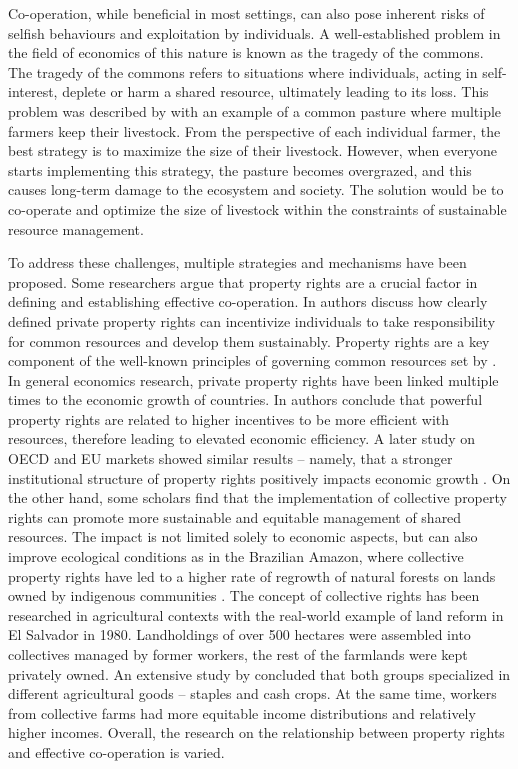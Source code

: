 \documentclass[preprint,12pt,authoryear]{elsarticle}
\begin{document}
Co-operation, while beneficial in most settings, can also pose inherent risks of selfish behaviours and exploitation by individuals. A well-established problem in the field of economics of this nature is known as the tragedy of the commons. The tragedy of the commons refers to situations where individuals, acting in self-interest, deplete or harm a shared resource, ultimately leading to its loss. This problem was described by \cite{hardin1968tragedy} with an example of a common pasture where multiple farmers keep their livestock. From the perspective of each individual farmer, the best strategy is to maximize the size of their livestock. However, when everyone starts implementing this strategy, the pasture becomes overgrazed, and this causes long-term damage to the ecosystem and society. The solution would be to co-operate and optimize the size of livestock within the constraints of sustainable resource management.

To address these challenges, multiple strategies and mechanisms have been proposed. Some researchers argue that property rights are a crucial factor in defining and establishing effective co-operation. In \cite{anderson2003property} authors discuss how clearly defined private property rights can incentivize individuals to take responsibility for common resources and develop them sustainably. Property rights are a key component of the well-known principles of governing common resources set by \cite{Ostrom1990}. In general economics research, private property rights have been linked multiple times to the economic growth of countries. In \cite{Jaffe1996} authors conclude that powerful property rights are related to higher incentives to be more efficient with resources, therefore leading to elevated economic efficiency. A later study on OECD and EU markets showed similar results – namely, that a stronger institutional structure of property rights positively impacts economic growth \citep{Haydarolu2015}. On the other hand, some scholars find that the implementation of collective property rights can promote more sustainable and equitable management of shared resources. The impact is not limited solely to economic aspects, but can also improve ecological conditions as in the Brazilian Amazon, where collective property rights have led to a higher rate of regrowth of natural forests on lands owned by indigenous communities \citep{Baragwanath2023}. The concept of collective rights has been researched in agricultural contexts with the real-world example of land reform in El Salvador in 1980. Landholdings of over 500 hectares were assembled into collectives managed by former workers, the rest of the farmlands were kept privately owned. An extensive study by \cite{montero2022cooperative} concluded that both groups specialized in different agricultural goods – staples and cash crops. At the same time, workers from collective farms had more equitable income distributions and relatively higher incomes. Overall, the research on the relationship between property rights and effective co-operation is varied.
\end{document}
